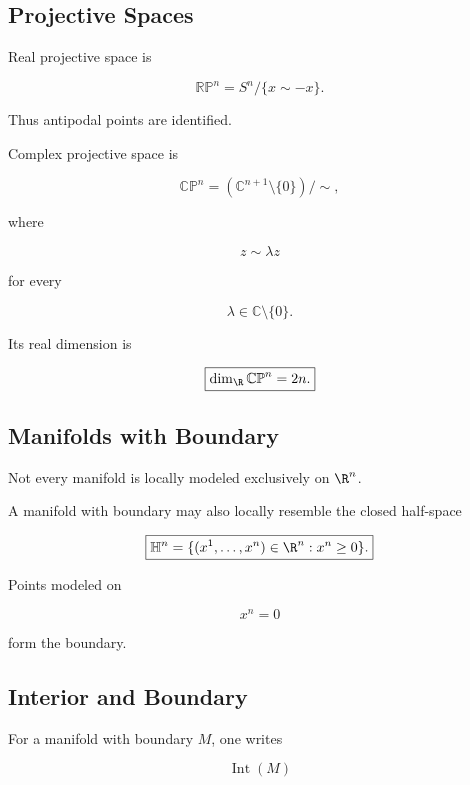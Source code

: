 \subsection{Projective Spaces}
\label{subsec:projective-spaces-manifolds}

Real projective space is

\[
\boxed{
\mathbb{RP}^n
=
S^n/\{x\sim -x\}.
}
\]

Thus antipodal points are identified.

Complex projective space is

\[
\boxed{
\mathbb{CP}^n
=
(\mathbb{C}^{n+1}\setminus\{0\})/\sim,
}
\]

where

\[
z\sim\lambda z
\]

for every

\[
\lambda\in\mathbb{C}\setminus\{0\}.
\]

Its real dimension is

\[
\boxed{
\dim_{\R}\mathbb{CP}^n=2n.
}
\]

\subsection{Manifolds with Boundary}
\label{subsec:manifolds-with-boundary}

Not every manifold is locally modeled exclusively on \(\R^n\).

A manifold with boundary may also locally resemble the closed half-space

\[
\boxed{
\mathbb{H}^n
=
\{
(x^1,\ldots,x^n)\in\R^n:
x^n\geq0
\}.
}
\]

Points modeled on

\[
x^n=0
\]

form the boundary.

\subsection{Interior and Boundary}
\label{subsec:manifold-interior-boundary}

For a manifold with boundary \(M\), one writes

\[
\boxed{
\operatorname{Int}(M)
}
\]

